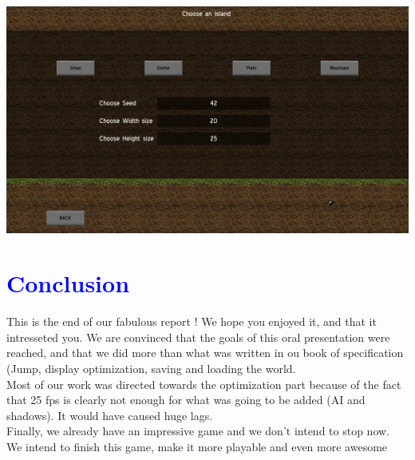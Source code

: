 \documentclass[article]{report}             %
\begin{document}
				\begin{center}
					\includegraphics[width = 16cm]{images/Graphics/menuNew.png}	
				\end{center}	


		\chapter{\textcolor{blue}{Conclusion}}

			This is the end of our fabulous report ! We hope you enjoyed it, and that it intresseted you.  We are convinced that the goals of this oral presentation were reached, and that we did more than what was written in ou book of specification (Jump, display optimization, saving and loading the world. \\
		Most of our  work was directed towards the optimization part because of the fact that 25 fps is clearly not enough for what was going to be added (AI and shadows). It would have caused huge lags.\\

Finally, we already have an impressive game and we don't intend to stop now. We intend to finish this game, make it more playable and even more awesome
\end{document}
